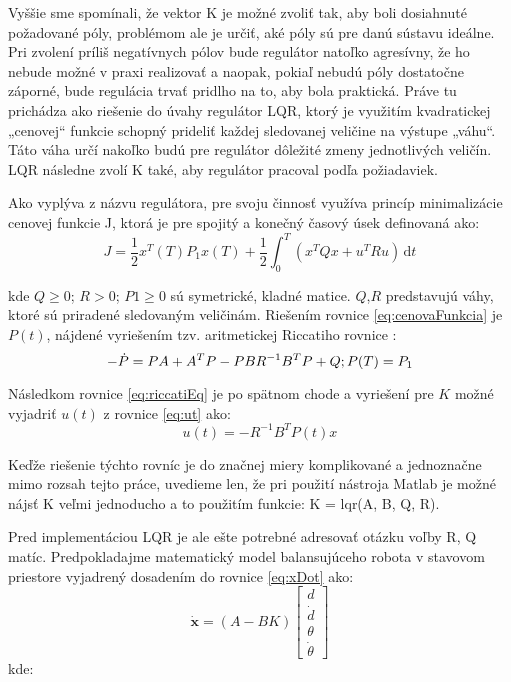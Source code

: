 Vyššie sme spomínali, že vektor K je možné zvoliť tak, aby boli dosiahnuté požadované póly, problémom ale je určiť, aké póly sú pre danú sústavu ideálne. Pri zvolení príliš negatívnych pólov bude regulátor natoľko agresívny, že ho nebude možné v praxi realizovať a naopak, pokiaľ nebudú póly dostatočne záporné, bude regulácia trvať pridlho na to, aby bola praktická.  Práve tu prichádza ako riešenie do úvahy regulátor LQR, ktorý je využitím kvadratickej „cenovej“ funkcie schopný prideliť každej sledovanej veličine na výstupe „váhu“. Táto váha určí nakoľko budú pre regulátor dôležité zmeny jednotlivých veličín. LQR následne zvolí K také, aby regulátor pracoval podľa požiadaviek.

Ako vyplýva z názvu regulátora, pre svoju činnosť využíva princíp minimalizácie cenovej funkcie J, ktorá je pre spojitý a konečný časový úsek definovaná ako:
\begin{equation}
J = \dfrac {1} {2} x^T (T)P_1 x(T)  + \dfrac {1} {2} \int_0^T \! ( x^T Qx + u^T Ru) \, \mathrm{d}t 
\label{eq:cenovaFunkcia}
\end{equation}

kde $Q \geq 0$; $R > 0$; $P1 \geq 0$ sú symetrické, kladné matice. $Q$,$ R$ predstavujú váhy, ktoré sú priradené sledovaným veličinám.
Riešením rovnice \ref{eq:cenovaFunkcia} je $P(t)$, nájdené vyriešením tzv. aritmetickej Riccatiho rovnice :
\begin{equation}
- \dot {P} = PA + A^T P - PBR^{-1} B^T P + Q;	\\
P( T ) = P_1
\label{eq:riccatiEq}
\end{equation}

Následkom rovnice \ref{eq:riccatiEq} je po spätnom chode a vyriešení pre $K$ možné vyjadriť $u(t)$ z rovnice \ref{eq:ut} ako:
\begin{equation}
u( t ) = -R^{-1} B^T P( t )x
\end{equation}

Keďže riešenie týchto rovníc je do značnej miery komplikované a jednoznačne mimo rozsah tejto práce, uvedieme len, že pri použití nástroja Matlab je možné nájsť K veľmi jednoducho a to použitím funkcie: K = lqr(A, B, Q, R).

Pred implementáciou LQR je ale ešte potrebné adresovať otázku voľby R, Q matíc. Predpokladajme matematický model balansujúceho robota v stavovom priestore vyjadrený dosadením do rovnice \ref{eq:xDot} ako:
\begin{equation}
\dot {\textbf {x}} = (A - BK) \begin{bmatrix}
d \\
\dot{d} \\
\theta \\
\dot{\theta} 
\end{bmatrix}
\end{equation}
kde: 

